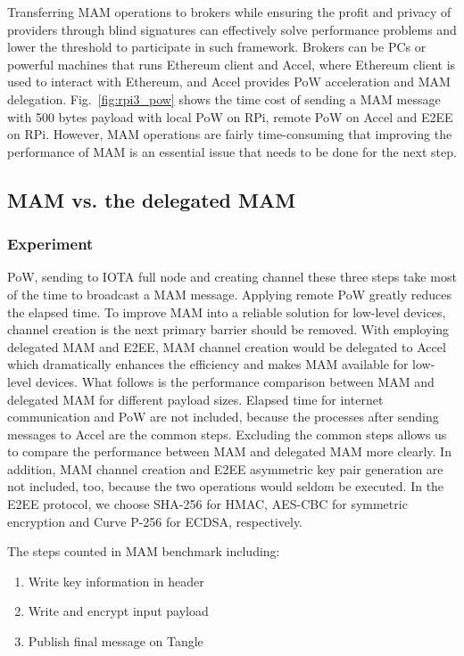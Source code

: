 \documentclass[conference]{IEEEtran}
\begin{document}
Transferring MAM operations to brokers while ensuring the profit and privacy of providers through blind signatures can effectively solve performance problems and lower the threshold to participate in such framework. Brokers can be PCs or powerful machines that runs Ethereum client and Accel, where Ethereum client is used to interact with Ethereum, and Accel provides PoW acceleration and MAM delegation. Fig.~\ref{fig:rpi3_pow} shows the time cost of sending a MAM message with 500 bytes payload with local PoW on RPi, remote PoW on Accel and E2EE on RPi. However, MAM operations are fairly time-consuming that improving the performance of MAM is an essential issue that needs to be done for the next step.

\subsection{MAM vs. the delegated MAM}
\label{section:smart_contract_evaluation}

\subsubsection{Experiment}
PoW, sending to IOTA full node and creating channel these three steps take most of the time to broadcast a MAM message. Applying remote PoW greatly reduces the elapsed time. To improve MAM into a reliable solution for low-level devices, channel creation is the next primary barrier should be removed. With employing delegated MAM and E2EE, MAM channel creation would be delegated to Accel which dramatically enhances the efficiency and makes MAM available for low-level devices. What follows is the performance comparison between MAM and delegated MAM for different payload sizes. Elapsed time for internet communication and PoW are not included, because the processes after sending messages to Accel are the common steps. Excluding the common steps allows us to compare the performance between MAM and delegated MAM more clearly. In addition, MAM channel creation and E2EE asymmetric key pair generation are not included, too, because the two operations would seldom be executed. In the E2EE protocol, we choose SHA-256 for HMAC, AES-CBC for symmetric encryption and Curve P-256 for ECDSA, respectively.

The steps counted in MAM benchmark including:
\begin{enumerate}
    \item Write key information in header
	\item Write and encrypt input payload
	\item Publish final message on Tangle
\end{enumerate}
\end{document}
